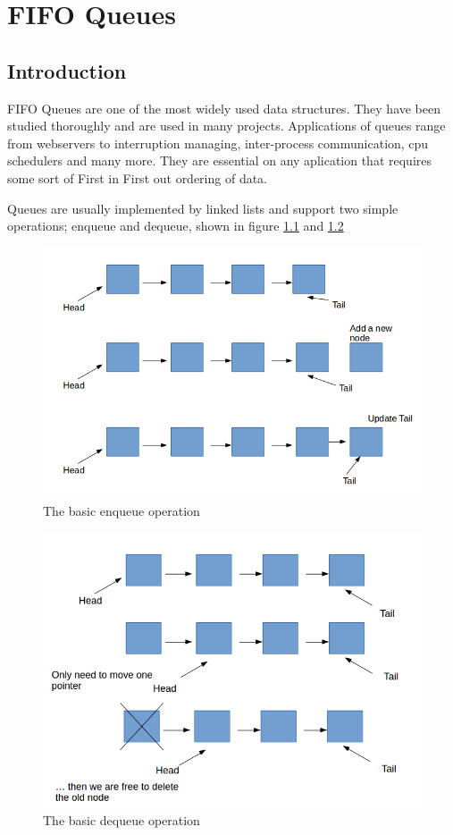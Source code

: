 \def\<#1>{\textit{#1}}

\chapter{FIFO Queues}
\section{Introduction}

FIFO Queues are one of the most widely used data structures. They have been studied thoroughly and are used in many projects. Applications of queues range from webservers to interruption managing, inter-process communication, cpu schedulers and many more. They are essential on any aplication that requires some sort of First in First out ordering of data.

Queues are usually implemented by linked lists and support two simple operations; enqueue and dequeue, shown in figure \ref{basic_enqueue} and \ref{basic_dequeue}


\begin{figure}
 \centering
  \includegraphics[scale=0.5]{basic_enqueue.png}
\caption{ The basic enqueue operation}
\label{basic_enqueue}
\end{figure}

\begin{figure}
 \centering
  \includegraphics[scale=0.5]{basic_dequeue.png}
\caption{ The basic dequeue operation}
\label{basic_dequeue}
\end{figure}


